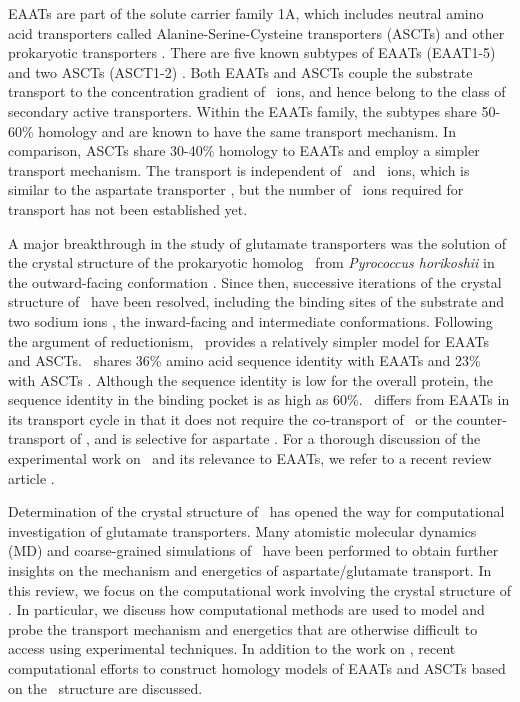 EAATs are part of the solute carrier family 1A, which includes neutral amino 
acid transporters called Alanine-Serine-Cysteine transporters (ASCTs) and other 
prokaryotic transporters \cite{Slotboom1999}. There are five known subtypes of 
EAATs (EAAT1-5) and two ASCTs (ASCT1-2) 
\cite{Arriza1993,Shafqat1993,Utsunomiya-Tate1996}. Both EAATs and ASCTs couple 
the substrate transport to the concentration gradient of \Na\ ions, and hence 
belong to the class of secondary active transporters. Within the EAATs family, 
the subtypes share 50-60\% homology and are known to have the same transport 
mechanism. In comparison, ASCTs share 30-40\% homology to EAATs and employ a 
simpler transport mechanism. The transport is independent of \Hi\ and \K\ 
ions, which is similar to the aspartate transporter \GltPh, but 
the number of \Na\ ions required for transport has not been established yet.

A major breakthrough in the study of glutamate transporters was the solution of
the crystal structure of the prokaryotic homolog \GltPh\ from
\textit{Pyrococcus horikoshii} in the outward-facing conformation
\cite{Yernool2004}. Since then, successive iterations of the crystal structure
of \GltPh\ have been resolved, including the binding sites of the substrate and
two sodium ions \cite{Boudker2007}, the inward-facing \cite{Reyes2009} and
intermediate \cite{Verdon2012} conformations. Following the argument of
reductionism, \GltPh\ provides a relatively simpler model for EAATs and
ASCTs. \GltPh\ shares 36\% amino acid sequence identity with EAATs
\cite{Yernool2004} and 23\% with ASCTs \cite{Shafqat1993}. Although the sequence
identity is low for the overall protein, the sequence identity in the binding
pocket is as high as 60\%. \GltPh\ differs from EAATs in its transport cycle in
that it does not require the co-transport of \Hi\ or the counter-transport of
\K, and is selective for aspartate \cite{Ryan2009}. For a thorough
discussion of the experimental work on \GltPh\ and its relevance to EAATs,
we refer to a recent review article \cite{Vandenberg2013}.

Determination of the crystal structure of \GltPh\ has opened the way for
computational investigation of glutamate transporters. Many atomistic molecular
dynamics (MD) and coarse-grained simulations of \GltPh\ have been performed to
obtain  further insights on the mechanism and energetics of aspartate/glutamate
transport. In this review, we focus on the computational work involving the
crystal structure of \GltPh. In particular, we discuss how computational methods
are used to model and probe the transport mechanism and energetics that are
otherwise difficult to access using experimental techniques. In addition to
the work on \GltPh, recent computational efforts to construct homology models
of EAATs and ASCTs based on the \GltPh\ structure are discussed. 

